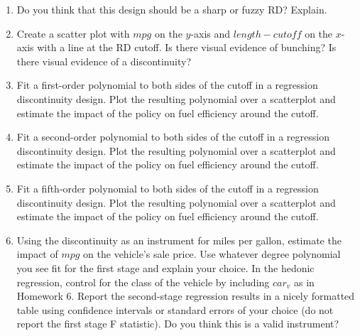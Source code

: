 \documentclass{article}
\begin{document}
\begin{enumerate}
    \item Do you think that this design should be a sharp or fuzzy RD? Explain.
    \item Create a scatter plot with $mpg$ on the $y$-axis and $length-cutoff$ on the $x$-axis with a line at the RD cutoff.  Is there visual evidence of bunching?  Is there visual evidence of a discontinuity?
    \item Fit a first-order polynomial to both sides of the cutoff in a regression discontinuity design.  Plot the resulting polynomial over a scatterplot and estimate the impact of the policy on fuel efficiency around the cutoff.
    \item Fit a second-order polynomial to both sides of the cutoff in a regression discontinuity design.  Plot the resulting polynomial over a scatterplot and estimate the impact of the policy on fuel efficiency around the cutoff.
    \item Fit a fifth-order polynomial to both sides of the cutoff in a regression discontinuity design.  Plot the resulting polynomial over a scatterplot and estimate the impact of the policy on fuel efficiency around the cutoff.
    \item Using the discontinuity as an instrument for miles per gallon, estimate the impact of $mpg$ on the vehicle's sale price.  Use whatever degree polynomial you see fit for the first stage and explain your choice.  In the hedonic regression, control for the class of the vehicle by including $car_v$ as in Homework 6.  Report the second-stage regression results in a nicely formatted table using confidence intervals or standard errors of your choice (do not report the first stage F statistic).  Do you think this is a valid instrument?
\end{enumerate}
\end{document}

